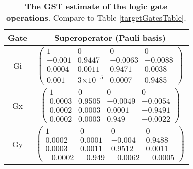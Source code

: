 \documentclass{article}[11pt]
\providecommand{\e}[1]{\ensuremath{\times 10^{#1}}}
\begin{document}
\begin{table}[h]
\begin{center}
\begin{tabular}[l]{|c|c|}
\hline
Gate & Superoperator (Pauli basis) \\ \hline
Gi & $ \left(\!\!\begin{array}{cccc}
1 & 0 & 0 & 0 \\ 
-0.001 & 0.9447 & -0.0063 & -0.0088 \\ 
0.0004 & 0.0011 & 0.9471 & 0.0038 \\ 
0.001 & 3\e{-5} & 0.0007 & 0.9485
 \end{array}\!\!\right) $
 \\ \hline
Gx & $ \left(\!\!\begin{array}{cccc}
1 & 0 & 0 & 0 \\ 
0.0003 & 0.9505 & -0.0049 & -0.0054 \\ 
0.0002 & 0.0003 & 0.0001 & -0.9491 \\ 
0.0002 & 0.0003 & 0.949 & -0.0022
 \end{array}\!\!\right) $
 \\ \hline
Gy & $ \left(\!\!\begin{array}{cccc}
1 & 0 & 0 & 0 \\ 
0.0002 & 0.0001 & -0.004 & 0.9488 \\ 
0.0003 & 0.0011 & 0.9512 & 0.0011 \\ 
-0.0002 & -0.949 & -0.0062 & -0.0005
 \end{array}\!\!\right) $
 \\ \hline
\end{tabular}

\caption{\textbf{The GST estimate of the logic gate operations}.  Compare to Table \ref{targetGatesTable}.\label{bestGatesetGatesTable}}
\end{center}
\end{table}
\end{document}
